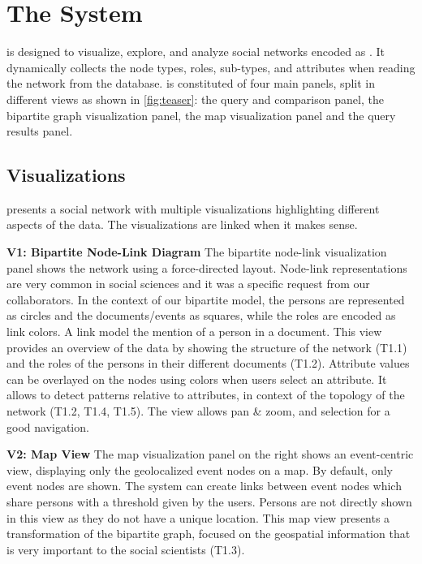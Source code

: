 \section{The \name System}\label{sec:system}

\name is designed to visualize, explore, and analyze social networks encoded as \model. It dynamically collects the node types, roles, sub-types, and attributes when reading the network from the database. \name is constituted of four main panels, split in different views as shown in \autoref{fig:teaser}: the query and comparison panel, the bipartite graph visualization panel, the map visualization panel and the query results panel.

\subsection{Visualizations}

\name presents a social network with multiple visualizations highlighting different aspects of the data. The visualizations are linked when it makes sense.

\noindent\textbf{V1: Bipartite Node-Link Diagram}
The bipartite node-link visualization panel shows the network using a force-directed layout. Node-link representations are very common in social sciences \cite{Gephi} \cite{batagelj_pajek_nodate} and it was a specific request from our collaborators. In the context of our bipartite model, the persons are represented as circles and the documents/events as squares, while the roles are encoded as link colors. A link model the mention of a person in a document. This view provides an overview of the data by showing the structure of the network (T1.1) and the roles of the persons in their different documents (T1.2). Attribute values can be overlayed on the nodes using colors when users select an attribute. It allows to detect patterns relative to attributes, in context of the topology of the network (T1.2, T1.4, T1.5). The view allows pan \& zoom, and selection for a good navigation.

\noindent\textbf{V2: Map View}
The map visualization panel on the right shows an event-centric view, displaying only the geolocalized event nodes on a map.
By default, only event nodes are shown. The system can create links between event nodes which share persons with a threshold given by the users.
Persons are not directly shown in this view as they do not have a unique location. This map view presents a transformation of the bipartite graph, focused on the geospatial information that is very important to the social scientists (T1.3).

